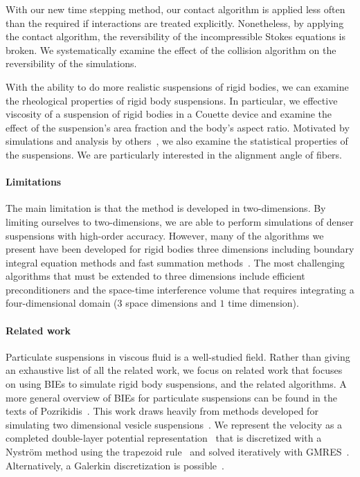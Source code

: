 \documentclass[preprint, 10pt]{elsarticle}
\begin{document}
With our new time stepping method, our contact algorithm is applied less
often than the required if interactions are treated explicitly.
Nonetheless, by applying the contact algorithm, the reversibility of the
incompressible Stokes equations is broken.  We systematically examine
the effect of the collision algorithm on the reversibility of the
simulations.

With the ability to do more realistic suspensions of rigid bodies, we
can examine the rheological properties of rigid body suspensions.  In
particular, we effective viscosity of a suspension of rigid bodies in a
Couette device and examine the effect of the suspension's area fraction
and the body's aspect ratio.  Motivated by simulations and analysis by
others~\cite{}, we also examine the statistical properties of the
suspensions.  We are particularly interested in the alignment angle of
fibers.

\paragraph{Limitations} The main limitation is that the method is
developed in two-dimensions.  By limiting ourselves to two-dimensions,
we are able to perform simulations of denser suspensions with high-order
accuracy.  However, many of the algorithms we present have been
developed for rigid bodies three dimensions including boundary integral
equation methods and fast summation methods~\cite{cor-gre-rac-vee2017,
kli-tor2014, kli-tor2016}.  The most challenging algorithms that must be
extended to three dimensions include efficient preconditioners and the
space-time interference volume that requires integrating a
four-dimensional domain ($3$ space dimensions and $1$ time dimension).


\paragraph{Related work} Particulate suspensions in viscous fluid is a
well-studied field.  Rather than giving an exhaustive list of all the
related work, we focus on related work that focuses on using BIEs to
simulate rigid body suspensions, and the related algorithms.  A more
general overview of BIEs for particulate suspensions can be found in the
texts of Pozrikidis~\cite{Pozrikidis1992, Guazzelli2011, Karrila1991}.
This work draws heavily from methods developed for simulating two
dimensional vesicle suspensions~\cite{Quaife2014, Quaife2015,
qua-bir2016, Rahimian2010, Lu2017}.  We represent the velocity as a completed double-layer potential representation~\cite{Power1987,
Power1993, Karrila1989} that is discretized with a Nystr\"om method
using the trapezoid rule~\cite{Trefethan2014} and solved iteratively with
GMRES~\cite{Saad1986}.  Alternatively, a Galerkin discretization is
possible~\cite{Mammoli1999, Mammoli2002, Mammoli2006}.
\end{document}
